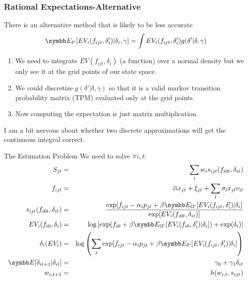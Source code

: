 \documentclass[aspectratio=169,11pt]{beamer}
\begin{document}
\begin{frame}
\frametitle{Rational Expectations-Alternative}
There is an alternative method that is likely to be less accurate
\begin{eqnarray*}
\E_{\delta'}[ E V_i (f_{ijt}, \delta_i') |\delta_i, \gamma ]= \int EV_i(f_{ijt},\delta_{i}') g(\delta' | \delta, \gamma)
\end{eqnarray*}
\begin{enumerate}
\item We need to integrate $EV(f_{ijt},\delta_i)$ (a function) over a normal density but we only see it at the grid points of our state space.
\item We could \alert{discretize $g(\delta' | \delta,\gamma)$} so that it is a valid markov transition probability matrix (TPM) evaluated only at the grid points.
\item Now computing the expectation is just matrix multiplication.
\end{enumerate}
I am a bit nervous about whether two discrete approximations will get the continuous integral correct.
\end{frame}

\begin{frame}{The Estimation Problem}
We need to solve $\forall i, t $:
\begin{eqnarray*}
S_{jt} &=& \sum_i w_i s_{ijt}(f_{i0t},\delta_{it})\\
f_{ijt} &=& \overline{\alpha} x_{jt} + \xi_{jt} + \sum_l \sigma_l x_{jl} \nu_{il} \\
s_{ijt}(f_{i0t},\delta_{it}) &=& \frac{\exp[f_{ijt} - \alpha_i p_{jt} + \beta \E_{\Omega'}[ EV_i (f_{ijt}, \delta_i') |\delta_i] }{\exp [EV_i(f_{i0t},\delta_{it}) ]}\\
EV_i(f_{i0}, \delta_i) &=& \log\left[ \exp( f_{i0} + \beta \E_{\Omega'}[ EV_i (f_{i0}, \delta_i') |\delta_i] )+ \exp(\delta_i)  \right]\\
\delta_{i}(EV_i) &=& \log \left( \sum_j \exp[ f_{ijt}  -\alpha_i p_{jt} + \beta \E_{\delta'}[ E V_i (f_{ijt}, \delta_i') |\delta_i ]  \right)\\
\E[\delta_{it+1} | \delta_{it}] &=& \gamma_0 + \gamma_1 \delta_{it}\\
w_{i,t+1} &=&h(w_{i,t},s_{ijt})\\
\end{eqnarray*}
\end{frame}
\end{document}
